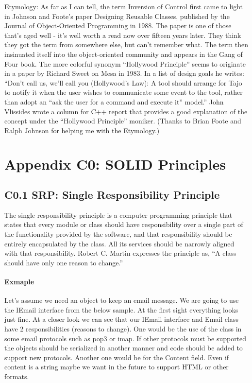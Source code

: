 \documentclass{book}
\begin{document}
Etymology: As far as I can tell, the term Inversion of Control first came to light in Johnson and Foote's paper Designing Reusable Classes,
published by the Journal of Object-Oriented Programming in 1988.
The paper is one of those that's aged well - it's well worth a read now over fifteen years later. They think they got the term from somewhere else, but can't remember what.
The term then insinuated itself into the object-oriented community and appears in the Gang of Four book.
The more colorful synonym ``Hollywood Principle'' seems to originate in a paper by Richard Sweet on Mesa in 1983. 
In a list of design goals he writes: ``Don't call us, we'll call you (Hollywood's Law):
A tool should arrange for Tajo to notify it when the user wishes to communicate some event to the tool,
rather than adopt an ``ask the user for a command and execute it'' model.''
John Vlissides wrote a column for C++ report that provides a good explanation of the concept under the ``Hollywood Principle'' moniker.
(Thanks to Brian Foote and Ralph Johnson for helping me with the Etymology.)



\section{Appendix C0: SOLID Principles}\label{ac0sp}
\subsection{C0.1 SRP: Single Responsibility Principle}\label{SRP}
The single responsibility principle is a computer programming principle that states that every module or class should 
have responsibility over a single part of the functionality provided by the software, and that responsibility should be entirely encapsulated by the class.
All its services should be narrowly aligned with that responsibility.
Robert C. Martin expresses the principle as, ``A class should have only one reason to change.''

\paragraph{Exmaple}
Let's assume we need an object to keep an email message. We are going to use the IEmail interface from the below sample.
At the first sight everything looks just fine. At a closer look we can see that our IEmail interface and Email class have 2 responsibilities (reasons to change).
One would be the use of the class in some email protocols such as pop3 or imap.
If other protocols must be supported the objects should be serialized in another manner and code should be added to support new protocols.
Another one would be for the Content field. Even if content is a string maybe we want in the future to support HTML or other formats.
\end{document}
